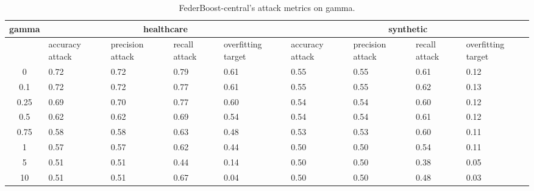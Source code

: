 \begin{table*}[]\centering
\begin{tabular}{|c| *{8}{m{1.0cm}|}}
\hline\rowcolor{gray!50}
\cellcolor{gray!80} gamma & \multicolumn{4}{c|}{healthcare} & \multicolumn{4}{c|}{synthetic}\\\hline 
& accuracy attack & precision attack & recall attack & overfitting target & accuracy attack & precision attack & recall attack & overfitting target\\\hline
0 & 0.72 & 0.72 & 0.79 & 0.61 & 0.55 & 0.55 & 0.61 & 0.12\\ \hline
0.1 & 0.72 & 0.72 & 0.77 & 0.61 & 0.55 & 0.55 & 0.62 & 0.13\\ \hline
0.25 & 0.69 & 0.70 & 0.77 & 0.60 & 0.54 & 0.54 & 0.60 & 0.12\\ \hline
0.5 & 0.62 & 0.62 & 0.69 & 0.54 & 0.54 & 0.54 & 0.61 & 0.12\\ \hline
0.75 & 0.58 & 0.58 & 0.63 & 0.48 & 0.53 & 0.53 & 0.60 & 0.11\\ \hline
1 & 0.57 & 0.57 & 0.62 & 0.44 & 0.50 & 0.50 & 0.54 & 0.11\\ \hline
5 & 0.51 & 0.51 & 0.44 & 0.14 & 0.50 & 0.50 & 0.38 & 0.05\\ \hline
10 & 0.51 & 0.51 & 0.67 & 0.04 & 0.50 & 0.50 & 0.48 & 0.03\\ \hline
\end{tabular} 
\caption{FederBoost-central's attack metrics on gamma.}
\label{tab:experiment1_gamma}
\end{table*}
